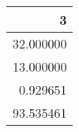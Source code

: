 \begin{tabular}{r}
\toprule
3 \\
\midrule
32.000000 \\
13.000000 \\
0.929651 \\
93.535461 \\
\bottomrule
\end{tabular}

